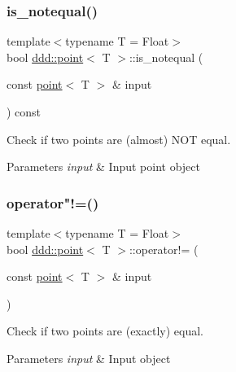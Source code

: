 \subsubsection{\texorpdfstring{is\+\_\+notequal()}{is\_notequal()}}
{\footnotesize\ttfamily template$<$typename T = Float$>$ \\
bool \hyperlink{classddd_1_1point}{ddd\+::point}$<$ T $>$\+::is\+\_\+notequal (\begin{DoxyParamCaption}\item[{const \hyperlink{classddd_1_1point}{point}$<$ T $>$ \&}]{input }\end{DoxyParamCaption}) const\hspace{0.3cm}{\ttfamily [inline]}}



Check if two points are (almost) N\+OT equal. 


\begin{DoxyParams}{Parameters}
{\em input} & Input point object \\
\hline
\end{DoxyParams}
\mbox{\label{classddd_1_1point_a2567b8c3cd08d965e70033f3f4a8d3db}} 
\subsubsection{\texorpdfstring{operator"!=()}{operator!=()}}
{\footnotesize\ttfamily template$<$typename T = Float$>$ \\
bool \hyperlink{classddd_1_1point}{ddd\+::point}$<$ T $>$\+::operator!= (\begin{DoxyParamCaption}\item[{const \hyperlink{classddd_1_1point}{point}$<$ T $>$ \&}]{input }\end{DoxyParamCaption})\hspace{0.3cm}{\ttfamily [inline]}}



Check if two points are (exactly) equal. 


\begin{DoxyParams}{Parameters}
{\em input} & Input object \\
\hline
\end{DoxyParams}
\mbox{\label{classddd_1_1point_a4291cf7411bd02324731a13143d718c6}} 
